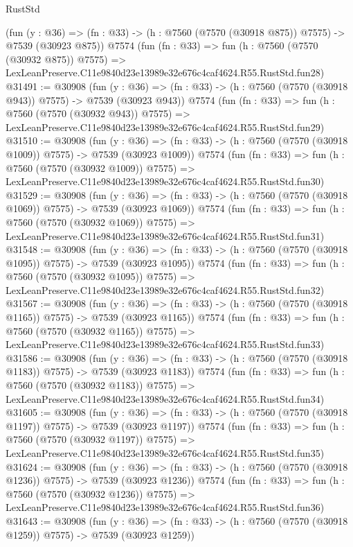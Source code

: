 \begin{lexlean}{RustStd}
\begin{coremodule}
    (fun (y : @36) => (fn : @33) -> (h : @7560 (@7570 (@30918 @875)) @7575) -> @7539 (@30923 @875))
    @7574
    (fun (fn : @33) =>
    fun (h : @7560 (@7570 (@30932 @875)) @7575) =>
    LexLeanPreserve.C11e9840d23e13989e32e676c4caf4624.R55.RustStd.fun28)
@31491 := @30908
    (fun (y : @36) => (fn : @33) -> (h : @7560 (@7570 (@30918 @943)) @7575) -> @7539 (@30923 @943))
    @7574
    (fun (fn : @33) =>
    fun (h : @7560 (@7570 (@30932 @943)) @7575) =>
    LexLeanPreserve.C11e9840d23e13989e32e676c4caf4624.R55.RustStd.fun29)
@31510 := @30908
    (fun (y : @36) =>
    (fn : @33) -> (h : @7560 (@7570 (@30918 @1009)) @7575) -> @7539 (@30923 @1009))
    @7574
    (fun (fn : @33) =>
    fun (h : @7560 (@7570 (@30932 @1009)) @7575) =>
    LexLeanPreserve.C11e9840d23e13989e32e676c4caf4624.R55.RustStd.fun30)
@31529 := @30908
    (fun (y : @36) =>
    (fn : @33) -> (h : @7560 (@7570 (@30918 @1069)) @7575) -> @7539 (@30923 @1069))
    @7574
    (fun (fn : @33) =>
    fun (h : @7560 (@7570 (@30932 @1069)) @7575) =>
    LexLeanPreserve.C11e9840d23e13989e32e676c4caf4624.R55.RustStd.fun31)
@31548 := @30908
    (fun (y : @36) =>
    (fn : @33) -> (h : @7560 (@7570 (@30918 @1095)) @7575) -> @7539 (@30923 @1095))
    @7574
    (fun (fn : @33) =>
    fun (h : @7560 (@7570 (@30932 @1095)) @7575) =>
    LexLeanPreserve.C11e9840d23e13989e32e676c4caf4624.R55.RustStd.fun32)
@31567 := @30908
    (fun (y : @36) =>
    (fn : @33) -> (h : @7560 (@7570 (@30918 @1165)) @7575) -> @7539 (@30923 @1165))
    @7574
    (fun (fn : @33) =>
    fun (h : @7560 (@7570 (@30932 @1165)) @7575) =>
    LexLeanPreserve.C11e9840d23e13989e32e676c4caf4624.R55.RustStd.fun33)
@31586 := @30908
    (fun (y : @36) =>
    (fn : @33) -> (h : @7560 (@7570 (@30918 @1183)) @7575) -> @7539 (@30923 @1183))
    @7574
    (fun (fn : @33) =>
    fun (h : @7560 (@7570 (@30932 @1183)) @7575) =>
    LexLeanPreserve.C11e9840d23e13989e32e676c4caf4624.R55.RustStd.fun34)
@31605 := @30908
    (fun (y : @36) =>
    (fn : @33) -> (h : @7560 (@7570 (@30918 @1197)) @7575) -> @7539 (@30923 @1197))
    @7574
    (fun (fn : @33) =>
    fun (h : @7560 (@7570 (@30932 @1197)) @7575) =>
    LexLeanPreserve.C11e9840d23e13989e32e676c4caf4624.R55.RustStd.fun35)
@31624 := @30908
    (fun (y : @36) =>
    (fn : @33) -> (h : @7560 (@7570 (@30918 @1236)) @7575) -> @7539 (@30923 @1236))
    @7574
    (fun (fn : @33) =>
    fun (h : @7560 (@7570 (@30932 @1236)) @7575) =>
    LexLeanPreserve.C11e9840d23e13989e32e676c4caf4624.R55.RustStd.fun36)
@31643 := @30908
    (fun (y : @36) =>
    (fn : @33) -> (h : @7560 (@7570 (@30918 @1259)) @7575) -> @7539 (@30923 @1259))

\end{coremodule}
\end{lexlean}
